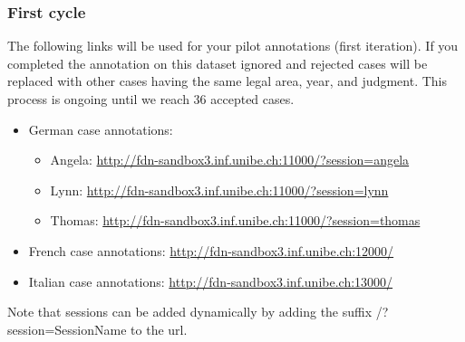 \documentclass{article}
\begin{document}
\subsubsection{First cycle}\label{1_cycle}
The following links will be used for your pilot annotations (first iteration). If you completed the annotation on this dataset ignored and rejected cases will be replaced with other cases having the same legal area, year, and judgment. This process is ongoing until we reach 36 accepted cases. 
\begin{itemize}
\item German case annotations:
\begin{itemize}
\item Angela: \href{http://fdn-sandbox3.inf.unibe.ch:11000/?session=angela}{http://fdn-sandbox3.inf.unibe.ch:11000/?session=angela}
    \item Lynn: \href{http://fdn-sandbox3.inf.unibe.ch:11000/?session=lynn}{http://fdn-sandbox3.inf.unibe.ch:11000/?session=lynn}
    \item Thomas: \href{http://fdn-sandbox3.inf.unibe.ch:11000/?session=thomas}{http://fdn-sandbox3.inf.unibe.ch:11000/?session=thomas}
\end{itemize}
    \item French case annotations: \href{http://fdn-sandbox3.inf.unibe.ch:12000/}{http://fdn-sandbox3.inf.unibe.ch:12000/}
    \item Italian case annotations: \href{http://fdn-sandbox3.inf.unibe.ch:13000/}{http://fdn-sandbox3.inf.unibe.ch:13000/}
\end{itemize}
Note that sessions can be added dynamically by adding the suffix {\color{blue}/?session=SessionName} to the url.
\end{document}

